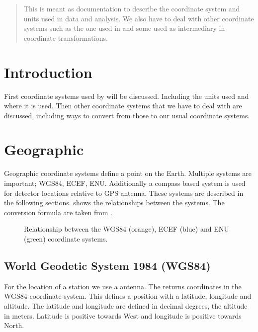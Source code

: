 \begin{abstract}

This is meant as documentation to describe the coordinate system and
units used in \hisparc data and analysis. We also have to deal with
other coordinate systems such as the one used in \corsika and some used
as intermediary in coordinate transformations.

\end{abstract}


\section{Introduction}

First coordinate systems used by \hisparc will be discussed. Including
the units used and where it is used. Then other coordinate systems that
we have to deal with are discussed, including ways to convert from those
to our usual coordinate systems.


\section{Geographic}

Geographic coordinate systems define a point on the Earth. Multiple
systems are important; WGS84, ECEF, ENU. Additionally a compass based
system is used for detector locations relative to GPS antenna. These
systems are described in the following sections.
 shows the relationships between the systems.
The conversion formula are taken from \cite{wikigeodetic}.

\begin{figure}
    \centering
    
    \caption{Relationship between the WGS84 (orange), ECEF (blue) and ENU
             (green) coordinate systems.}
    \label{fig:wgs84_ecef_enu}
\end{figure}


\subsection{World Geodetic System 1984 (WGS84)}

For the location of a station we use a \gps antenna. The \gps returns
coordinates in the WGS84 coordinate system. This defines a position with
a latitude, longitude and altitude. The latitude and longitude are
defined in decimal degrees, the altitude in meters. Latitude is positive
towards West and longitude is positive towards North.


